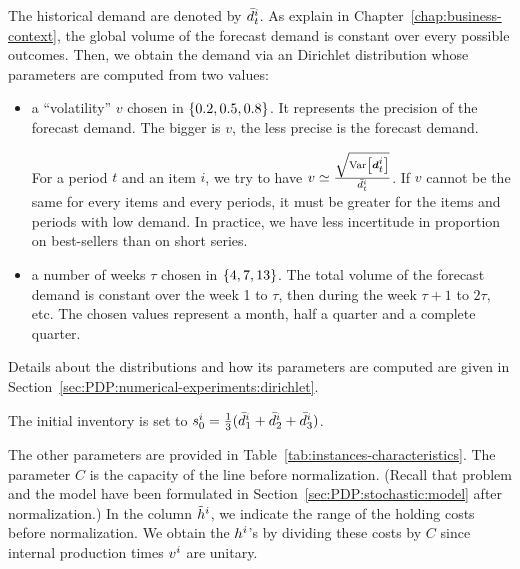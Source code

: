 The historical demand are denoted by $\bar{d}_t^i$. As explain in Chapter~\ref{chap:business-context}, the global volume of the forecast demand is constant over every possible outcomes. Then, we obtain the demand via an Dirichlet distribution whose parameters are computed from two values:
\begin{itemize}
  \item a ``volatility'' $v$ chosen in $\crbracket{0.2,0.5, 0.8}$. It represents the precision of the forecast demand. The bigger is $v$, the less precise is the forecast demand.

  For a period $t$ and an item $i$, we try to have $v\simeq\frac{\sqrt{\vari\sqbracket{\va\demand_t^i}}}{\bar{\demand}_t^i}$. If $v$ cannot be the same for every items and every periods, it must be greater for the items and periods with low demand. In practice, we have less incertitude in proportion on best-sellers than on short series.
  \item a number of weeks $\tau$ chosen in $\crbracket{4,7,13}$. The total volume of the forecast demand is constant over the week 1 to $\tau$, then during the week $\tau+1$ to $2\tau$, etc. The chosen values represent a month, half a quarter and a complete quarter.
\end{itemize}
Details about the distributions and how its parameters are computed are given in Section~\ref{sec:PDP:numerical-experiments:dirichlet}.

The initial inventory is set to $s_0^i=\frac{1}{3}(\bar{d}_1^i+\bar{d}_2^i+\bar{d}_3^i)$.

The other parameters are provided in Table~\ref{tab:instances-characteristics}.
The parameter $C$ is the capacity of the line before normalization. (Recall that problem and the model have been formulated in Section~\ref{sec:PDP:stochastic:model} after normalization.)
In the column $\tilde{h}^i$, we indicate the range of the holding costs before normalization. We obtain the $h^i$'s by dividing these costs by $C$ since internal production times $v^i$ are unitary.

